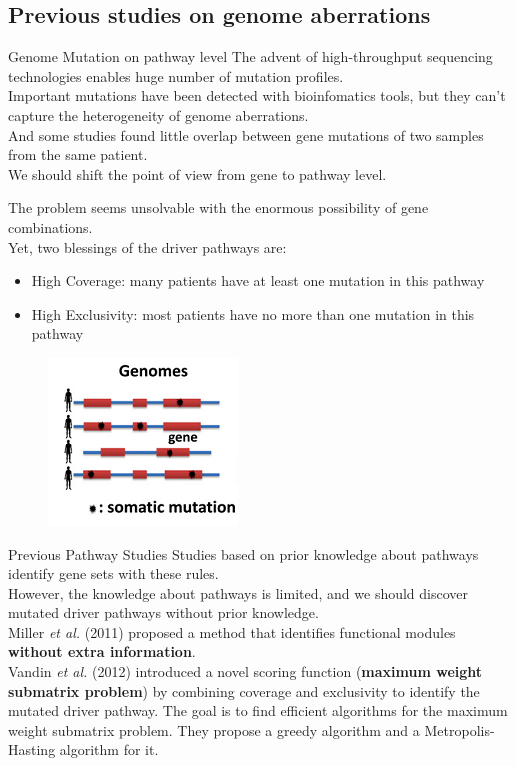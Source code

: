 \documentclass[xcolor=dvipsnames]{beamer}
\begin{document}
\subsection{Previous studies on genome aberrations}
\begin{frame}{Genome Mutation on pathway level}
The advent of high-throughput sequencing technologies enables huge number of mutation profiles.\\
Important mutations have been detected with bioinfomatics tools, but they can't capture the heterogeneity of genome aberrations.\\
And some studies found little overlap between gene mutations of two samples from the same patient.\\
We should shift the point of view from gene to pathway level.\\
\end{frame}
\begin{frame}
The problem seems unsolvable with the enormous possibility of gene combinations.\\
Yet, two blessings of the driver pathways are:\\
\begin{itemize}
\item High Coverage: many patients have at least one mutation in this pathway\\
\item High Exclusivity: most patients have no more than one mutation in this pathway\\
\end{itemize}
\begin{figure}
\centering
\includegraphics[width=0.4\linewidth]{segments.png}
\end{figure}
\end{frame}
\begin{frame}{Previous Pathway Studies}
Studies based on prior knowledge about pathways identify gene sets with these rules.\\
However, the knowledge about pathways is limited, and we should discover mutated driver pathways without prior knowledge.\\
Miller {\em et al.} (2011) proposed a method that identifies functional modules \textbf{without extra information}.\\
Vandin {\em et al.} (2012) introduced a novel scoring function (\textbf{maximum weight submatrix problem}) by combining coverage and exclusivity to identify the mutated driver pathway. The goal is to find efficient algorithms for the maximum weight submatrix problem. They propose a greedy algorithm and a Metropolis-Hasting algorithm for it.\\
\end{frame}
\end{document}
